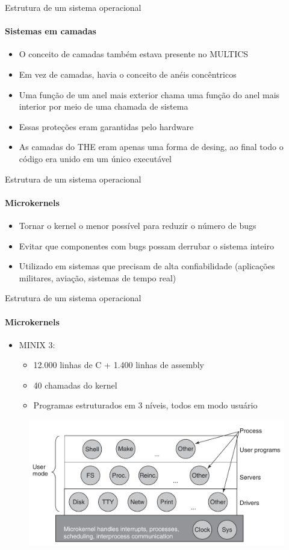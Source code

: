 \documentclass{beamer}
\begin{document}
\begin{frame}{Estrutura de um sistema operacional}
	\framesubtitle{Sistemas em camadas}
	\begin{itemize}
		\item O conceito de camadas também estava presente no MULTICS
		\item Em vez de camadas, havia o conceito de anéis concêntricos
		\item Uma função de um anel mais exterior chama uma função do anel mais interior por meio de uma chamada de sistema
		\item Essas proteções eram garantidas pelo hardware
		\item As camadas do THE eram apenas uma forma de desing, ao final todo o código era unido em um único executável
	\end{itemize}
\end{frame}
\begin{frame}{Estrutura de um sistema operacional}
	\framesubtitle{Microkernels}
	\begin{itemize}
		\item Tornar o kernel o menor possível para reduzir o número de bugs
		\item Evitar que componentes com bugs possam derrubar o sistema inteiro
		\item Utilizado em sistemas que precisam de alta confiabilidade (aplicações militares, aviação, sistemas de tempo real)
	\end{itemize}
\end{frame}
\begin{frame}{Estrutura de um sistema operacional}
	\framesubtitle{Microkernels}
	\begin{itemize}
		\item MINIX 3:
		\begin{itemize}
			\item 12.000 linhas de C +  1.400 linhas de assembly
			\item 40 chamadas do kernel
			\item Programas estruturados em 3 níveis, todos em modo usuário
		\end{itemize}
	\end{itemize}
	\begin{figure}
		\includegraphics[width=0.7\paperwidth]{resources/minix}
	\end{figure}
\end{frame}
\end{document}
